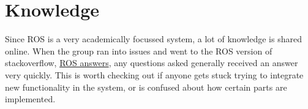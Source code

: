 \section{Knowledge}
Since ROS is a very academically focussed system, a lot of knowledge is shared online.
When the group ran into issues and went to the ROS version of stackoverflow, \href{https://answers.ros.org/questions/}{ROS answers}, any questions asked generally received an answer very quickly.
This is worth checking out if anyone gets stuck trying to integrate new functionality in the system, or is confused about how certain parts are implemented.

